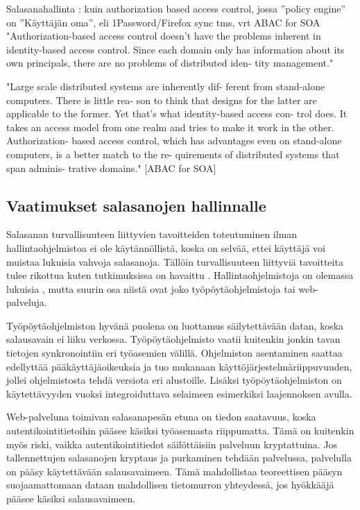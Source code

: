 \documentclass[english,gradu]{tktltiki}
\begin{document}
  Salasanahallinta : kuin authorization based access control, jossa ''policy engine'' on ''Käyttäjän oma'', eli 1Password/Firefox sync tms, vrt ABAC for SOA
  "Authorization-based access control doesn’t have
  the problems inherent in identity-based access control. Since each domain only has information about its own principals, there are no problems of distributed iden- tity management."


  "Large scale distributed systems are inherently dif-
  ferent from stand-alone computers. There is little rea- son to think that designs for the latter are applicable to the former. Yet that’s what identity-based access con- trol does. It takes an access model from one realm and tries to make it work in the other. Authorization- based access control, which has advantages even on stand-alone computers, is a better match to the re- quirements of distributed systems that span adminis- trative domains." [ABAC for SOA]



\subsection{Vaatimukset salasanojen hallinnalle} %
\label{sub:vaatimukset_salasanojen_hallinnalle}

           \label{sec:goals_for_pw_management}

         Salasanan turvallisuuteen liittyvien tavoitteiden toteutuminen ilman hallintaohjelmistoa ei ole käytännöllistä, koska on selvää, ettei käyttäjä voi muistaa lukuisia vahvoja salasanoja. Tällöin turvallisuuteen liittyviä tavoitteita tulee rikottua kuten tutkimuksissa on havaittu \cite{study_of_passwords_07, password_management_strategies_06}. Hallintaohjelmistoja on olemassa lukuisia \cite{dunn_password_managers_08}, mutta suurin osa niistä ovat joko työpöytäohjelmistoja tai web-palveluja.

         Työpöytäohjelmiston hyvänä puolena on luottamus säilytettävään datan, koska salausavain ei liiku verkossa. Työpöytäohjelmisto vaatii kuitenkin jonkin tavan tietojen synkronointiin eri työasemien välillä. Ohjelmiston asentaminen saattaa edellyttää pääkäyttäjäoikeuksia ja tuo mukanaan käyttöjärjestelmäriippuvuuden, jollei ohjelmistosta tehdä versiota eri alustoille. Lisäksi työpöytäohjelmiston on käytettävyyden vuoksi integroiduttava selaimeen esimerkiksi laajennoksen avulla.

         Web-palveluna toimivan salasanapesän etuna on tiedon saatavuus, koska autentikointitietoihin pääsee käsiksi työasemasta riippumatta. Tämä on kuitenkin myös riski, vaikka autentikointitiedot säilöttäisiin palveluun kryptattuina. Jos tallennettujen salasanojen kryptaus ja purkaminen tehdään palvelussa, palvelulla on pääsy käytettävään salausavaimeen. Tämä mahdollistaa teoreettisen pääsyn suojaamattomaan dataan mahdollisen tietomurron yhteydessä, jos hyökkääjä pääsee käsiksi salausavaimeen.
\end{document}
